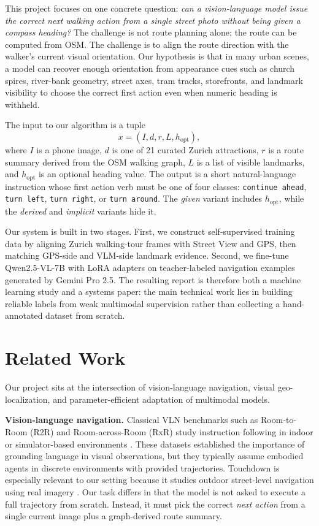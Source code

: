 \documentclass[10pt,twocolumn,letterpaper]{article}
\begin{document}
This project focuses on one concrete question: \textit{can a vision-language model issue the correct next walking action from a single street photo without being given a compass heading?} The challenge is not route planning alone; the route can be computed from OSM. The challenge is to align the route direction with the walker's current visual orientation. Our hypothesis is that in many urban scenes, a model can recover enough orientation from appearance cues such as church spires, river-bank geometry, street axes, tram tracks, storefronts, and landmark visibility to choose the correct first action even when numeric heading is withheld.

The input to our algorithm is a tuple
\begin{equation}
x = (I, d, r, L, h_{\text{opt}}),
\end{equation}
where $I$ is a phone image, $d$ is one of 21 curated Zurich attractions, $r$ is a route summary derived from the OSM walking graph, $L$ is a list of visible landmarks, and $h_{\text{opt}}$ is an optional heading value. The output is a short natural-language instruction whose first action verb must be one of four classes: \texttt{continue ahead}, \texttt{turn left}, \texttt{turn right}, or \texttt{turn around}.
The \textit{given} variant includes $h_{\text{opt}}$, while the \textit{derived} and \textit{implicit} variants hide it.

Our system is built in two stages. First, we construct self-supervised training data by aligning Zurich walking-tour frames with Street View and GPS, then matching GPS-side and VLM-side landmark evidence. Second, we fine-tune Qwen2.5-VL-7B with LoRA adapters on teacher-labeled navigation examples generated by Gemini Pro 2.5. The resulting report is therefore both a machine learning study and a systems paper: the main technical work lies in building reliable labels from weak multimodal supervision rather than collecting a hand-annotated dataset from scratch.

\section{Related Work}
Our project sits at the intersection of vision-language navigation, visual geo-localization, and parameter-efficient adaptation of multimodal models.

\textbf{Vision-language navigation.} Classical VLN benchmarks such as Room-to-Room (R2R) and Room-across-Room (RxR) study instruction following in indoor or simulator-based environments \cite{anderson2018vision,ku2020room}. These datasets established the importance of grounding language in visual observations, but they typically assume embodied agents in discrete environments with provided trajectories. Touchdown is especially relevant to our setting because it studies outdoor street-level navigation using real imagery \cite{chen2019touchdown}. Our task differs in that the model is not asked to execute a full trajectory from scratch. Instead, it must pick the correct \textit{next action} from a single current image plus a graph-derived route summary.
\end{document}
